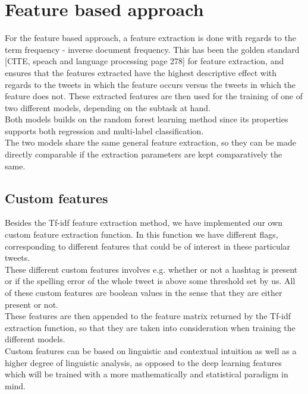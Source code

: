 
\section{Feature based approach}

For the feature based approach, a feature extraction is done with regards to the term frequency - inverse document frequency. This has been the golden standard [CITE, speach and language processing page 278] for feature extraction, and ensures that the features extracted have the highest descriptive effect with regards to the tweets in which the feature occurs versus the tweets in which the feature does not. These extracted features are then used for the training of one of two different models, depending on the subtask at hand.\\
Both models builds on the random forest learning method since its properties supports both regression and multi-label classification. \\
The two models share the same general feature extraction, so they can be made directly comparable if the extraction parameters are kept comparatively the same.
\subsection{Custom features}
Besides the Tf-idf feature extraction method, we have implemented our own custom feature extraction function. In this function we have different flags, corresponding to different features that could be of interest in these particular tweets. \\
These different custom features involves e.g. whether or not a hashtag is present or if the spelling error of the whole tweet is above some threshold set by us. All of these custom features are boolean values in the sense that they are either present or not. \\
These features are then appended to the feature matrix returned by the Tf-idf extraction function, so that they are taken into consideration when training the different models. \\
Custom features can be based on linguistic and contextual intuition as well as a higher degree of linguistic analysis, as opposed to the deep learning features which will be trained with a more mathematically and statistical paradigm in mind.


